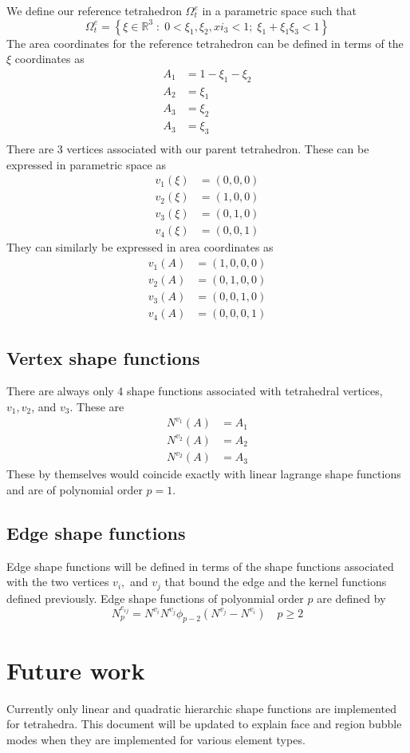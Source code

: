 \documentclass{article}
\begin{document}
We define our reference tetrahedron $\Omega^e_t$ in a parametric space
such that
\[
\Omega^e_t = \left\{ \xi \in \mathbb{R}^3 \; : \;
0 < \xi_1, \xi_2, xi_3 < 1; \; \xi_1 + \xi_1 \xi_3 < 1 \right\}
\]
The area coordinates for the reference tetrahedron can be defined in terms of
the $\xi$ coordinates as
\begin{align*}
A_1 &= 1 - \xi_1 - \xi_2 \\
A_2 &= \xi_1 \\
A_3 &= \xi_2 \\
A_3 &= \xi_3 \\
\end{align*}
There are 3 vertices associated with our parent tetrahedron. These can be
expressed in parametric space as
\begin{align*}
v_1(\xi) &= (0,0,0) \\
v_2(\xi) &= (1,0,0) \\
v_3(\xi) &= (0,1,0) \\
v_4(\xi) &= (0,0,1)
\end{align*}
They can similarly be expressed in area coordinates as
\begin{align*}
v_1(A) &= (1,0,0,0) \\
v_2(A) &= (0,1,0,0) \\
v_3(A) &= (0,0,1,0) \\
v_4(A) &= (0,0,0,1)
\end{align*}

\subsection{Vertex shape functions}

There are always only 4 shape functions associated with tetrahedral vertices, 
$v_1, v_2$, and $v_3$.
These are
\begin{align*}
N^{v_1}(A) &= A_1 \\
N^{v_2}(A) &= A_2 \\
N^{v_2}(A) &= A_3
\end{align*}
These by themselves would coincide exactly with linear lagrange shape
functions and are of polynomial order $p=1$.

\subsection{Edge shape functions}
Edge shape functions will be defined in terms of the shape functions
associated with the two vertices $v_i,$ and $v_j$ that bound the edge and the
kernel functions defined previously. Edge shape functions of polyonmial order
$p$ are defined by
\[
N^{e_{ij}}_p = N^{v_i} N^{v_j} \phi_{p-2}(N^{v_j} - N^{v_i})
\quad p \geq 2
\]

\section{Future work}
Currently only linear and quadratic hierarchic shape functions are
implemented for tetrahedra. This document will be updated to explain face
and region bubble modes when they are implemented for various element types.
\end{document}
